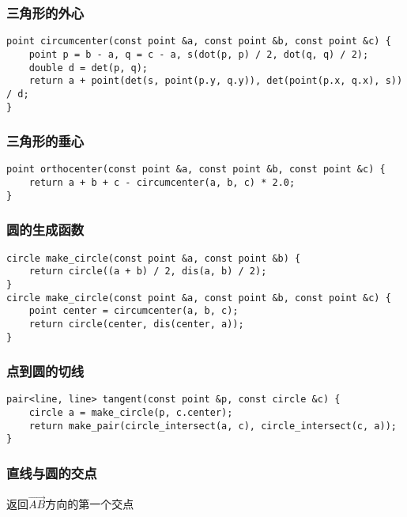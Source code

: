 \documentclass{article}
\begin{document}
\subsubsection{三角形的外心}

\begin{lstlisting}
point circumcenter(const point &a, const point &b, const point &c) {
    point p = b - a, q = c - a, s(dot(p, p) / 2, dot(q, q) / 2);
    double d = det(p, q);
    return a + point(det(s, point(p.y, q.y)), det(point(p.x, q.x), s)) / d;
}
\end{lstlisting}

\subsubsection{三角形的垂心}

\begin{lstlisting}
point orthocenter(const point &a, const point &b, const point &c) {
    return a + b + c - circumcenter(a, b, c) * 2.0;
}
\end{lstlisting}

\subsubsection{圆的生成函数}

\begin{lstlisting}
circle make_circle(const point &a, const point &b) {
    return circle((a + b) / 2, dis(a, b) / 2);
}
circle make_circle(const point &a, const point &b, const point &c) {
    point center = circumcenter(a, b, c);
    return circle(center, dis(center, a));
}
\end{lstlisting}

\subsubsection{点到圆的切线}

\begin{lstlisting}
pair<line, line> tangent(const point &p, const circle &c) {
    circle a = make_circle(p, c.center);
    return make_pair(circle_intersect(a, c), circle_intersect(c, a));
}
\end{lstlisting}

\subsubsection{直线与圆的交点}

返回$\overrightarrow{AB}$方向的第一个交点
\end{document}
